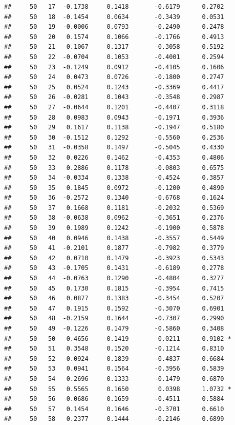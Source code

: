 \documentclass[
]{article}
\begin{document}
\begin{verbatim}
##     50   17  -0.1738     0.1418       -0.6179      0.2702  
##     50   18  -0.1454     0.0634       -0.3439      0.0531  
##     50   19  -0.0006     0.0793       -0.2490      0.2478  
##     50   20   0.1574     0.1066       -0.1766      0.4913  
##     50   21   0.1067     0.1317       -0.3058      0.5192  
##     50   22  -0.0704     0.1053       -0.4001      0.2594  
##     50   23  -0.1249     0.0912       -0.4105      0.1606  
##     50   24   0.0473     0.0726       -0.1800      0.2747  
##     50   25   0.0524     0.1243       -0.3369      0.4417  
##     50   26  -0.0281     0.1043       -0.3548      0.2987  
##     50   27  -0.0644     0.1201       -0.4407      0.3118  
##     50   28   0.0983     0.0943       -0.1971      0.3936  
##     50   29   0.1617     0.1138       -0.1947      0.5180  
##     50   30  -0.1512     0.1292       -0.5560      0.2536  
##     50   31  -0.0358     0.1497       -0.5045      0.4330  
##     50   32   0.0226     0.1462       -0.4353      0.4806  
##     50   33   0.2886     0.1178       -0.0803      0.6575  
##     50   34  -0.0334     0.1338       -0.4524      0.3857  
##     50   35   0.1845     0.0972       -0.1200      0.4890  
##     50   36  -0.2572     0.1340       -0.6768      0.1624  
##     50   37   0.1668     0.1181       -0.2032      0.5369  
##     50   38  -0.0638     0.0962       -0.3651      0.2376  
##     50   39   0.1989     0.1242       -0.1900      0.5878  
##     50   40   0.0946     0.1438       -0.3557      0.5449  
##     50   41  -0.2101     0.1877       -0.7982      0.3779  
##     50   42   0.0710     0.1479       -0.3923      0.5343  
##     50   43  -0.1705     0.1431       -0.6189      0.2778  
##     50   44  -0.0763     0.1290       -0.4804      0.3277  
##     50   45   0.1730     0.1815       -0.3954      0.7415  
##     50   46   0.0877     0.1383       -0.3454      0.5207  
##     50   47   0.1915     0.1592       -0.3070      0.6901  
##     50   48  -0.2159     0.1644       -0.7307      0.2990  
##     50   49  -0.1226     0.1479       -0.5860      0.3408  
##     50   50   0.4656     0.1419        0.0211      0.9102 *
##     50   51   0.3548     0.1520       -0.1214      0.8310  
##     50   52   0.0924     0.1839       -0.4837      0.6684  
##     50   53   0.0941     0.1564       -0.3956      0.5839  
##     50   54   0.2696     0.1333       -0.1479      0.6870  
##     50   55   0.5565     0.1650        0.0398      1.0732 *
##     50   56   0.0686     0.1659       -0.4511      0.5884  
##     50   57   0.1454     0.1646       -0.3701      0.6610  
##     50   58   0.2377     0.1444       -0.2146      0.6899  

\end{verbatim}
\end{document}
